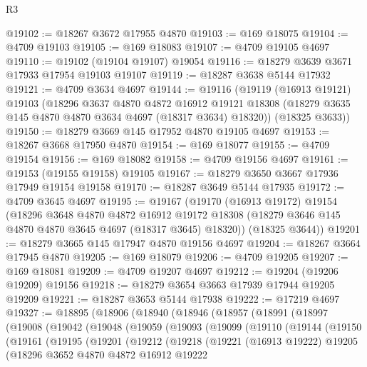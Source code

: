 \begin{lexlean}{R3}
\begin{coremodule}
@19102 := @18267 @3672 @17955 @4870
@19103 := @169 @18075
@19104 := @4709 @19103
@19105 := @169 @18083
@19107 := @4709 @19105 @4697
@19110 := @19102 (@19104 @19107) @19054
@19116 := @18279 @3639 @3671 @17933 @17954 @19103 @19107
@19119 := @18287 @3638 @5144 @17932
@19121 := @4709 @3634 @4697
@19144 := @19116
    (@19119
      (@16913 @19121)
      @19103
      (@18296
        @3637
        @4870
        @4872
        @16912
        @19121
        @18308
        (@18279 @3635 @145 @4870 @4870 @3634 @4697 (@18317 @3634) @18320))
      (@18325 @3633))
@19150 := @18279 @3669 @145 @17952 @4870 @19105 @4697
@19153 := @18267 @3668 @17950 @4870
@19154 := @169 @18077
@19155 := @4709 @19154
@19156 := @169 @18082
@19158 := @4709 @19156 @4697
@19161 := @19153 (@19155 @19158) @19105
@19167 := @18279 @3650 @3667 @17936 @17949 @19154 @19158
@19170 := @18287 @3649 @5144 @17935
@19172 := @4709 @3645 @4697
@19195 := @19167
    (@19170
      (@16913 @19172)
      @19154
      (@18296
        @3648
        @4870
        @4872
        @16912
        @19172
        @18308
        (@18279 @3646 @145 @4870 @4870 @3645 @4697 (@18317 @3645) @18320))
      (@18325 @3644))
@19201 := @18279 @3665 @145 @17947 @4870 @19156 @4697
@19204 := @18267 @3664 @17945 @4870
@19205 := @169 @18079
@19206 := @4709 @19205
@19207 := @169 @18081
@19209 := @4709 @19207 @4697
@19212 := @19204 (@19206 @19209) @19156
@19218 := @18279 @3654 @3663 @17939 @17944 @19205 @19209
@19221 := @18287 @3653 @5144 @17938
@19222 := @17219 @4697
@19327 := @18895
    (@18906
      (@18940
        (@18946
          (@18957
            (@18991
              (@18997
                (@19008
                  (@19042
                    (@19048
                      (@19059
                        (@19093
                          (@19099
                            (@19110
                              (@19144
                                (@19150
                                  (@19161
                                    (@19195
                                      (@19201
                                        (@19212
                                          (@19218
                                            (@19221
                                              (@16913 @19222)
                                              @19205
                                              (@18296
                                                @3652
                                                @4870
                                                @4872
                                                @16912
                                                @19222

\end{coremodule}
\end{lexlean}
